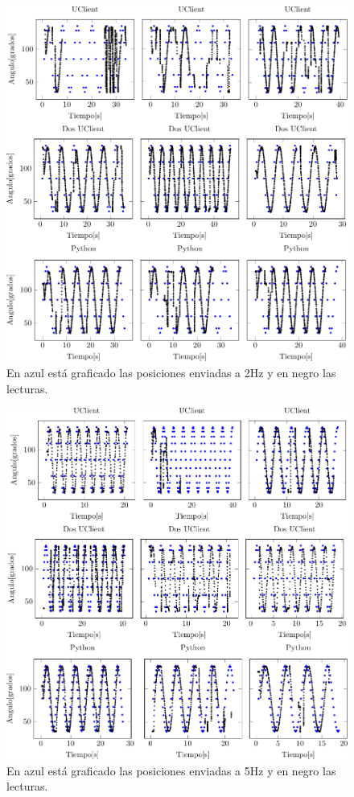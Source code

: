 \documentclass[12pt,a4paper,final,twoside]{book}
\begin{document}
\begin{figure}[H]
	\centering
    \includegraphics[scale=1]{plots/h2.pdf}
	 \caption{En azul está graficado las posiciones enviadas a 2Hz y en negro las lecturas.}
  \label{fig:sin2H}
\end{figure}
\begin{figure}[H]
	\centering
   \includegraphics[scale=1]{plots/h5.pdf}
	 \caption{En azul está graficado las posiciones enviadas a 5Hz y en negro las lecturas. }
  \label{fig:sin5H}
\end{figure}
\end{document}
